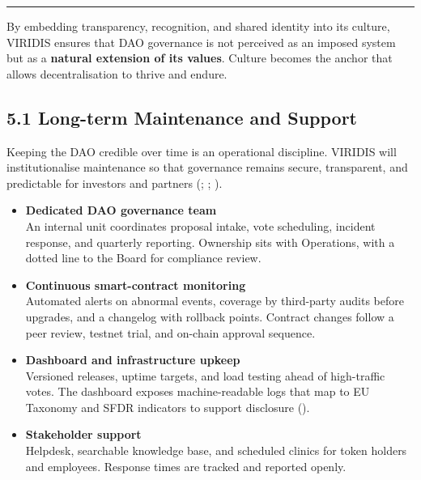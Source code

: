 \documentclass[
  english,
  12pt,
  oneside,
  open=any]{scrbook}
\begin{document}
\begin{center}\rule{0.5\linewidth}{0.5pt}\end{center}

By embedding transparency, recognition, and shared identity into its
culture, VIRIDIS ensures that DAO governance is not perceived as an
imposed system but as a \textbf{natural extension of its values}.
Culture becomes the anchor that allows decentralisation to thrive and
endure.

\subsection{5.1 Long-term Maintenance and
Support}\label{sec-maintenance}

Keeping the DAO credible over time is an operational discipline. VIRIDIS
will institutionalise maintenance so that governance remains secure,
transparent, and predictable for investors and partners
(;
; ).

\begin{itemize}
\item
  \textbf{Dedicated DAO governance team}\\
  An internal unit coordinates proposal intake, vote scheduling,
  incident response, and quarterly reporting. Ownership sits with
  Operations, with a dotted line to the Board for compliance review.
\item
  \textbf{Continuous smart-contract monitoring}\\
  Automated alerts on abnormal events, coverage by third-party audits
  before upgrades, and a changelog with rollback points. Contract
  changes follow a peer review, testnet trial, and on-chain approval
  sequence.
\item
  \textbf{Dashboard and infrastructure upkeep}\\
  Versioned releases, uptime targets, and load testing ahead of
  high-traffic votes. The dashboard exposes machine-readable logs that
  map to EU Taxonomy and SFDR indicators to support disclosure
  ().
\item
  \textbf{Stakeholder support}\\
  Helpdesk, searchable knowledge base, and scheduled clinics for token
  holders and employees. Response times are tracked and reported openly.
\end{itemize}
\end{document}
